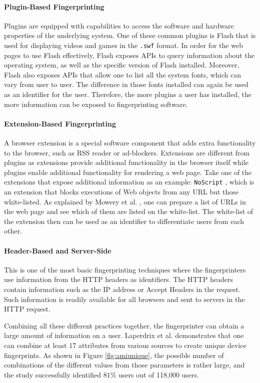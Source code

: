 \documentclass{acm_proc_article-sp}
\begin{document}
\paragraph{Plugin-Based Fingerprinting}
Plugins are equipped with capabilities to access the software and hardware properties of the underlying system. One of these common plugins is Flash that is used for displaying videos and games in the \verb|.swf| format. In order for the web pages to use Flash effectively, Flash exposes APIs to query information about the operating system, as well as the specific version of Flash installed.
Moreover, Flash also exposes APIs that allow one to list all the system fonts, which can vary from user to user. The difference in those fonts installed can again be used as an identifier for the user.
Therefore, the more plugins a user has installed, the more information can be exposed to fingerprinting software.

\paragraph{Extension-Based Fingerprinting}
A browser extension is a special software component that adds extra functionality to the browser, such as RSS reader or ad-blockers. Extensions are different from plugins as extensions provide additional functionality in the browser itself while plugins enable additional functionality for rendering a web page. Take one of the extensions that expose additional
information as an example: \verb|NoScript| \cite{noscript}, which is an extension that blocks executions of Web objects from any URL but those white-listed. As explained by Mowery et al. \cite{mowery:fg}, one can prepare a list of URLs in the web page and see which of them are listed on the white-list. The white-list of the extension then can be used as an identifier to differentiate users from each other.

\paragraph{Header-Based and Server-Side}
This is one of the most basic fingerprinting techniques where the fingerprinters use information from the HTTP headers as identifiers. The HTTP headers contain information such as the IP address or Accept Headers in the request. Such information is readily available for all browsers and sent to  servers in the HTTP request.

Combining all these different practices together, the fingerprinter can obtain a large amount of information on a user.  Laperdrix et al. \cite{pierre:beauty} demonstrates that one can combine at least 17 attributes from various sources to create unique device fingerprints. As shown in Figure \ref{fig:amiunique}, the possible number of combinations of the different values from those parameters is rather large, and the study successfully identified $81\%$ users out of 118,000 users.
\end{document}
